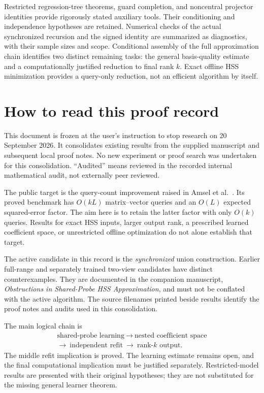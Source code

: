 \documentclass[11pt,oneside,openany,a4paper]{report}
\numberwithin{equation}{chapter}
\theoremstyle{definition}
\theoremstyle{remark}
\begin{document}
Restricted regression-tree theorems, guard completion, and noncentral projector identities provide rigorously stated auxiliary tools. Their conditioning and independence hypotheses are retained. Numerical checks of the actual synchronized recursion and the signed identity are summarized as diagnostics, with their sample sizes and scope. Conditional assembly of the full approximation chain identifies two distinct remaining tasks: the general basis-quality estimate and a computationally justified reduction to final rank $k$. Exact offline HSS minimization provides a query-only reduction, not an efficient algorithm by itself.

\chapter*{How to read this proof record}
This document is frozen at the user's instruction to stop research on 20 September 2026. It consolidates existing results from the supplied manuscript and subsequent local proof notes. No new experiment or proof search was undertaken for this consolidation. ``Audited'' means reviewed in the recorded internal mathematical audit, not externally peer reviewed.

The public target is the query-count improvement raised in Amsel et al.\ \cite{amsel2025}. Its proved benchmark has $O(kL)$ matrix--vector queries and an $O(L)$ expected squared-error factor. The aim here is to retain the latter factor with only $O(k)$ queries. Results for exact HSS inputs, larger output rank, a prescribed learned coefficient space, or unrestricted offline optimization do not alone establish that target.

The active candidate in this record is the \emph{synchronized} union construction. Earlier full-range and separately trained two-view candidates have distinct counterexamples. They are documented in the companion manuscript, \emph{Obstructions in Shared-Probe HSS Approximation}, and must not be conflated with the active algorithm. The source filenames printed beside results identify the proof notes and audits used in this consolidation.

The main logical chain is
\[
\begin{gathered}
\text{shared-probe learning}
\ \longrightarrow\ \text{nested coefficient space}\\
\longrightarrow\ \text{independent refit}
\ \longrightarrow\ \text{rank-}k\text{ output}.
\end{gathered}
\]
The middle refit implication is proved. The learning estimate remains open, and the final computational implication must be justified separately. Restricted-model results are presented with their original hypotheses; they are not substituted for the missing general learner theorem.
\end{document}
